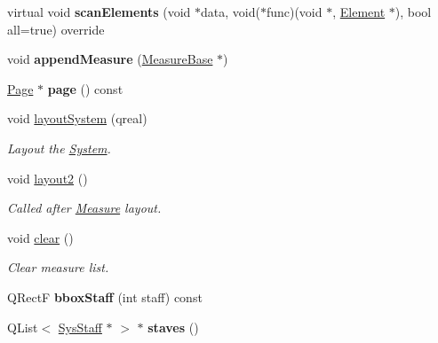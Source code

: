 \begin{DoxyCompactItemize}
virtual void {\bfseries scan\+Elements} (void $\ast$data, void($\ast$func)(void $\ast$, \hyperlink{class_ms_1_1_element}{Element} $\ast$), bool all=true) override
\item 
\mbox{\label{class_ms_1_1_system_a0d7f809a91a9458cea81a2ab84f42532}} 
void {\bfseries append\+Measure} (\hyperlink{class_ms_1_1_measure_base}{Measure\+Base} $\ast$)
\item 
\mbox{\label{class_ms_1_1_system_a57af65dafb20c1282ea78ba3d74725a0}} 
\hyperlink{class_ms_1_1_page}{Page} $\ast$ {\bfseries page} () const
\item 
\mbox{\label{class_ms_1_1_system_a91117c29dff2f80f45c0f5448d676882}} 
void \hyperlink{class_ms_1_1_system_a91117c29dff2f80f45c0f5448d676882}{layout\+System} (qreal)
\begin{DoxyCompactList}\small\item\em Layout the \hyperlink{class_ms_1_1_system}{System}. \end{DoxyCompactList}\item 
\mbox{\label{class_ms_1_1_system_a50176508633e0790e3569239bf671d62}} 
void \hyperlink{class_ms_1_1_system_a50176508633e0790e3569239bf671d62}{layout2} ()
\begin{DoxyCompactList}\small\item\em Called after \hyperlink{class_ms_1_1_measure}{Measure} layout. \end{DoxyCompactList}\item 
void \hyperlink{class_ms_1_1_system_a630eb061f651b37400274e180f12cc62}{clear} ()
\begin{DoxyCompactList}\small\item\em Clear measure list. \end{DoxyCompactList}\item 
\mbox{\label{class_ms_1_1_system_a3add6eef88e135d9a45f3e31d2e21b5c}} 
Q\+RectF {\bfseries bbox\+Staff} (int staff) const
\item 
\mbox{\label{class_ms_1_1_system_a436845d5d0032348dfe5f9618d12cb0c}} 
Q\+List$<$ \hyperlink{class_ms_1_1_sys_staff}{Sys\+Staff} $\ast$ $>$ $\ast$ {\bfseries staves} ()
\item 

\end{DoxyCompactItemize}
